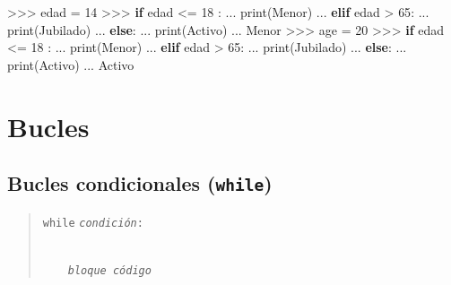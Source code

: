 \documentclass[
  spanish,
  a4paper,
]{scrreport}
\newenvironment{Shaded}{\begin{snugshade}}{\end{snugshade}}
\newcommand{\BuiltInTok}[1]{\textcolor[rgb]{0.00,0.23,0.31}{#1}}
\newcommand{\ControlFlowTok}[1]{\textcolor[rgb]{0.00,0.23,0.31}{\textbf{#1}}}
\newcommand{\DecValTok}[1]{\textcolor[rgb]{0.68,0.00,0.00}{#1}}
\newcommand{\NormalTok}[1]{\textcolor[rgb]{0.00,0.23,0.31}{#1}}
\newcommand{\OperatorTok}[1]{\textcolor[rgb]{0.37,0.37,0.37}{#1}}
\newcommand{\StringTok}[1]{\textcolor[rgb]{0.13,0.47,0.30}{#1}}
\begin{document}
\begin{Shaded}
\begin{Highlighting}[]
\OperatorTok{\textgreater{}\textgreater{}\textgreater{}}\NormalTok{ edad }\OperatorTok{=} \DecValTok{14}
\OperatorTok{\textgreater{}\textgreater{}\textgreater{}} \ControlFlowTok{if}\NormalTok{ edad }\OperatorTok{\textless{}=} \DecValTok{18}\NormalTok{ : }
\NormalTok{...     }\BuiltInTok{print}\NormalTok{(}\StringTok{\textquotesingle{}Menor\textquotesingle{}}\NormalTok{)}
\NormalTok{... }\ControlFlowTok{elif}\NormalTok{ edad }\OperatorTok{\textgreater{}} \DecValTok{65}\NormalTok{:}
\NormalTok{...     }\BuiltInTok{print}\NormalTok{(}\StringTok{\textquotesingle{}Jubilado\textquotesingle{}}\NormalTok{)}
\NormalTok{... }\ControlFlowTok{else}\NormalTok{:}
\NormalTok{...     }\BuiltInTok{print}\NormalTok{(}\StringTok{\textquotesingle{}Activo\textquotesingle{}}\NormalTok{)}
\NormalTok{...}
\NormalTok{Menor}
\OperatorTok{\textgreater{}\textgreater{}\textgreater{}}\NormalTok{ age }\OperatorTok{=} \DecValTok{20}
\OperatorTok{\textgreater{}\textgreater{}\textgreater{}} \ControlFlowTok{if}\NormalTok{ edad }\OperatorTok{\textless{}=} \DecValTok{18}\NormalTok{ : }
\NormalTok{...     }\BuiltInTok{print}\NormalTok{(}\StringTok{\textquotesingle{}Menor\textquotesingle{}}\NormalTok{)}
\NormalTok{... }\ControlFlowTok{elif}\NormalTok{ edad }\OperatorTok{\textgreater{}} \DecValTok{65}\NormalTok{:}
\NormalTok{...     }\BuiltInTok{print}\NormalTok{(}\StringTok{\textquotesingle{}Jubilado\textquotesingle{}}\NormalTok{)}
\NormalTok{... }\ControlFlowTok{else}\NormalTok{:}
\NormalTok{...     }\BuiltInTok{print}\NormalTok{(}\StringTok{\textquotesingle{}Activo\textquotesingle{}}\NormalTok{)}
\NormalTok{...}
\NormalTok{Activo}
\end{Highlighting}
\end{Shaded}


\chapter{Bucles}\label{bucles}

\section{\texorpdfstring{Bucles condicionales
(\texttt{while})}{Bucles condicionales (while)}}\label{bucles-condicionales-while}

\begin{quote}
\texttt{while} \emph{\texttt{condición}}\texttt{:}\strut \\
    \emph{\texttt{bloque\ código}}
\end{quote}
\end{document}
